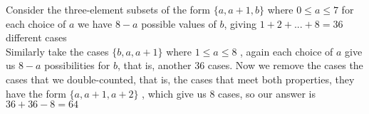 \documentclass[12pt]{article}
\begin{document}
\begin{spacing}{1.3}
\begin{solution}[64]
   Consider the three-element subsets of the form $\{a,a+1,b\}$ where $0\leq a \leq 7$
    for each choice of $a$ we have $8-a$ possible values of $b$, giving $1+2+...+8=36$ 
    different cases\\
    Similarly take the cases $\{b,a,a+1\}$ where $1\leq a \leq 8$ , again each choice of $a$ 
    give us $8-a$ possibilities for $b$, that is, another 36 cases.
    Now we remove the cases the cases that we double-counted, that is, the cases that 
    meet both properties, they have the form $\{a,a+1,a+2\}$ , which give us 8 cases, so
    our answer is $36+36-8=64$
\end{solution}

\end{spacing}
\end{document}
